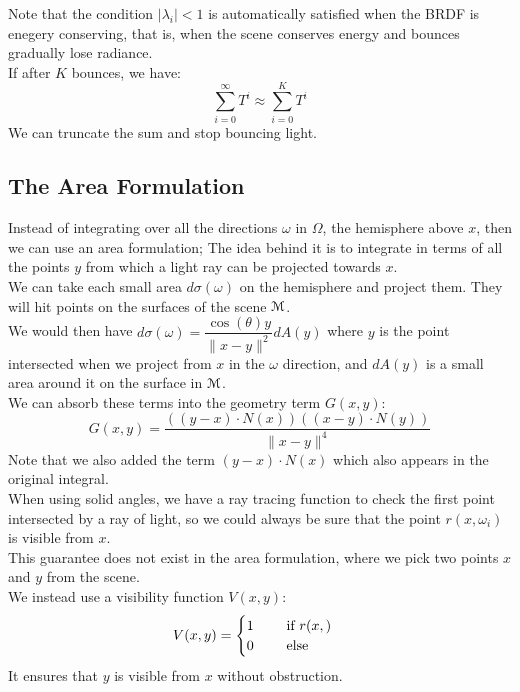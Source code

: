 \documentclass[12pt]{article}
\begin{document}
Note that the condition $|\lambda_i| < 1$ is automatically
satisfied when the BRDF is enegery conserving, that is,
when the scene conserves energy and bounces gradually
lose radiance. \\

If after $K$ bounces, we have:
\[ \sum_{i=0}^{\infty} T^i \approx \sum_{i=0}^{K} T^i \]
We can truncate the sum and stop bouncing light. \\

\newpage

\subsection*{The Area Formulation}

Instead of integrating over all the directions
$\omega$ in $\Omega$, the hemisphere
above $x$,
then we can use an area formulation;
The idea behind it is to integrate
in terms of all the points $y$
from which a light ray can be projected
towards $x$. \\

We can take each small area $d\sigma(\omega)$
on the hemisphere and project them.
They will hit points on the surfaces
of the scene $\mathcal{M}$. \\

We would then have $d\sigma(\omega)
= \dfrac{\cos(\theta)y}{\|x-y\|^2}dA(y)$
where $y$ is the point intersected
when we project from $x$ in the $\omega$
direction, and $dA(y)$ is a small area around it
on the surface in $\mathcal{M}$. \\

We can absorb these terms into the
geometry term $G(x, y)$:
\[ G(x, y) = \dfrac{((y-x)\cdot N(x))((x-y)\cdot N(y))}
{\|x-y\|^4} \]
Note that we also added the term $(y-x)\cdot N(x)$
which also appears in the original integral. \\

When using solid angles, we have a ray tracing 
function to check the first point intersected
by a ray of light, so we could always be sure
that the point $r(x, \omega_i)$ is visible
from $x$. \\
This guarantee does not exist in the area formulation,
where we pick two points $x$ and $y$ from
the scene. \\
We instead use a visibility function $V(x, y)$:
\[ V(x, y) = \begin{cases} 
    1 \qquad \text{ if } r(x, ) \\
    0 \qquad \text{ else }
 \end{cases} \]
It ensures that $y$ is visible from $x$
without obstruction. \\
\end{document}
